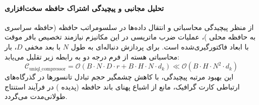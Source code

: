 \paragraph{تحلیل مجانبی و پیچیدگی اشتراک حافظه سخت‌افزاری}
از منظر پیچیدگی محاسباتی و انتقال داده‌ها در سلسومراتب حافظه (حافظه سراسری  به حافظه محلی )، عملیات ضرب ماتریسی در این مکانیزم نیازمند تخصیص بافر موقت با ابعاد فاکتورگیری‌شده است. برای پردازش دنباله‌ای به طول $N$ با بعد مخفی $D$، بار محاسباتی هسته از فرم درجه دو به رابطه زیر تقلیل می‌یابد:
\begin{equation}
\label{eq:complexity_uniql_compressor}
\mathcal{C}_{\text{uniql\_compressor}} = \mathcal{O}\left( B \cdot N \cdot D \cdot r + B \cdot H \cdot N \cdot d_k \right) \ll \mathcal{O}\left( B \cdot H \cdot N^2 \cdot d_k \right)
\end{equation}
این بهبود مرتبه پیچیدگی، با کاهش چشمگیر حجم تبادل تانسورها در گذرگاه‌های ارتباطی کارت گرافیک، مانع از اشباع پهنای باند حافظه (پدیده ) در فرآیند استنتاج طولانی‌مدت می‌گردد.
